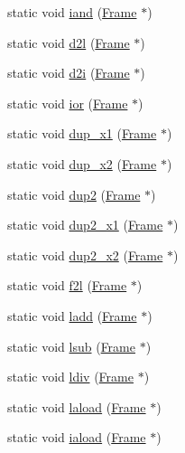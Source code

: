 \begin{DoxyCompactItemize}
\item 
static void \hyperlink{class_instruction_impl_aba2f920cff854e1d0c98d562d3c46396}{iand} (\hyperlink{struct_frame}{Frame} $\ast$)
\item 
static void \hyperlink{class_instruction_impl_afd580eaf7b2cc3be44f96adad64b5d81}{d2l} (\hyperlink{struct_frame}{Frame} $\ast$)
\item 
static void \hyperlink{class_instruction_impl_a2a3b0e3de17459c749969308b18be5f9}{d2i} (\hyperlink{struct_frame}{Frame} $\ast$)
\item 
static void \hyperlink{class_instruction_impl_a72ce9c7344312c90f08b5d75923e7a8e}{ior} (\hyperlink{struct_frame}{Frame} $\ast$)
\item 
static void \hyperlink{class_instruction_impl_a79c7b953ad51131ac015eb14dfdfe53e}{dup\+\_\+x1} (\hyperlink{struct_frame}{Frame} $\ast$)
\item 
static void \hyperlink{class_instruction_impl_ac3a59efe8fba23274bc8375ef6505b79}{dup\+\_\+x2} (\hyperlink{struct_frame}{Frame} $\ast$)
\item 
static void \hyperlink{class_instruction_impl_a9847d6132f46fb58988b30003e7191b4}{dup2} (\hyperlink{struct_frame}{Frame} $\ast$)
\item 
static void \hyperlink{class_instruction_impl_a52be3a5b77e011f1b1e1d731e2043fab}{dup2\+\_\+x1} (\hyperlink{struct_frame}{Frame} $\ast$)
\item 
static void \hyperlink{class_instruction_impl_ae37dc5de4dbdecb489f68b3c6c41e51f}{dup2\+\_\+x2} (\hyperlink{struct_frame}{Frame} $\ast$)
\item 
static void \hyperlink{class_instruction_impl_ad33731d93b2e05cfd3a7f1affac9a3eb}{f2l} (\hyperlink{struct_frame}{Frame} $\ast$)
\item 
static void \hyperlink{class_instruction_impl_ad175d18883253df593764a86dcf6992c}{ladd} (\hyperlink{struct_frame}{Frame} $\ast$)
\item 
static void \hyperlink{class_instruction_impl_a33975aa2d171de97acbabd60d78e0c0d}{lsub} (\hyperlink{struct_frame}{Frame} $\ast$)
\item 
static void \hyperlink{class_instruction_impl_a77216bb231dc03ecfdeebba20a604d98}{ldiv} (\hyperlink{struct_frame}{Frame} $\ast$)
\item 
static void \hyperlink{class_instruction_impl_a72b5f96fcf66463bedb4a1ccc3e5cedc}{laload} (\hyperlink{struct_frame}{Frame} $\ast$)
\item 
static void \hyperlink{class_instruction_impl_a23407267ca6c24df4b2138e5a5b40788}{iaload} (\hyperlink{struct_frame}{Frame} $\ast$)

\end{DoxyCompactItemize}
